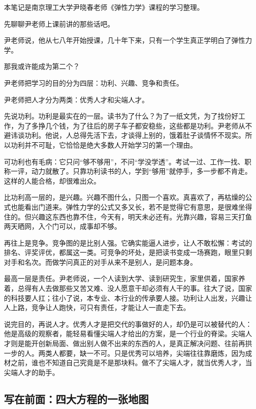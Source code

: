
本笔记是南京理工大学尹晓春老师《弹性力学》课程的学习整理。

先聊聊尹老师上课前讲的那些话吧。

尹老师说，他从七八年开始授课，几十年下来，只有一个学生真正学明白了弹性力学。

那我或许能成为第二个？

尹老师把学习的目的分为四层：功利、兴趣、竞争和责任。

尹老师把人才分为两类：优秀人才和尖端人才。

先说功利。功利是最实在的一层。读书为了什么？为了一纸文凭，为了找份好工作，为了多挣几个钱，为了往后的房子车子都安稳些，这些都是功利。尹老师从不避讳谈功利。他说，人总得先活下去，才谈得上别的，饿着肚子谈情怀不现实。所以功利并不可耻，它恰恰是绝大多数人开始学习的第一个理由。

可功利也有毛病：它只问“够不够用”，不问“学没学透”。考试一过、工作一找、职称一评，动力就散了。只靠功利读书的人，学到“够用”就停手，多一步都不肯走。这样的人能合格，却很难出众。

比功利高一层的，是兴趣。兴趣不图什么，只图一个喜欢。真喜欢了，再枯燥的公式也能看出门道来。弹性力学的公式又多又长，若不是觉得它有意思，是很难坐得住的。但兴趣这东西也靠不住，今天有，明天未必还有。光靠兴趣，容易三天打鱼两天晒网，入个门可以，成事却不够。

再往上是竞争。竞争图的是比别人强。它确实能逼人进步，让人不敢松懈：考试的排名、评奖评优，都属这一类。可竞争的坏处，是把读书变成一场赛跑，眼里只剩对手和名次。而做学问真正的对手从来不是别人，是问题本身。

最高一层是责任。尹老师说，一个人读到大学、读到研究生，家里供着，国家养着，总得有人去做那些又苦又难、没人愿意干却必须有人干的事。往大了说，国家的科技要人扛；往小了说，本专业、本行业的传承要人接。功利让人出发，兴趣让人上路，竞争让人跑快，可只有责任，才能让人一直走下去。

说完目的，再说人才。优秀人才是把交代的事做好的人，却仍是可以被替代的人：他是高级的观察者，能轻易看懂尖端人才给出的方案，是一个行业的脊梁。尖端人才则是能开创新局面、做出别人做不出来的东西的人，是真正解决问题、往前再拱一步的人。两类人都要，缺一不可。只是优秀可以培养，尖端往往靠磨炼，因为成材之前，谁也不知道自己究竟是不是那块料。做不了尖端人才，就当优秀人才，当尖端人才的助手。

\subsection*{写在前面：四大方程的一张地图}

